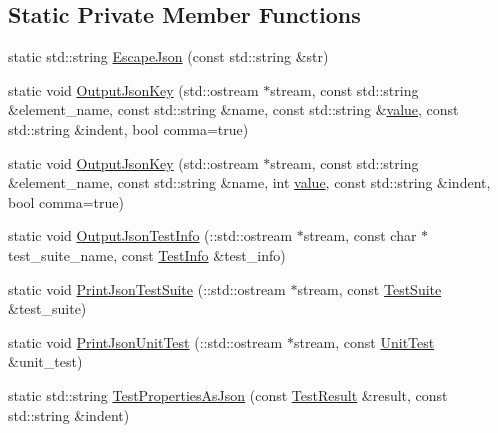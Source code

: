 \subsection*{Static Private Member Functions}
\begin{DoxyCompactItemize}
\item 
static std\+::string \mbox{\hyperlink{classtesting_1_1internal_1_1_json_unit_test_result_printer_a1db1a765a0ed6402d9585f2fe131fde6}{Escape\+Json}} (const std\+::string \&str)
\item 
static void \mbox{\hyperlink{classtesting_1_1internal_1_1_json_unit_test_result_printer_a63dcc481aba7d2305fad8ad9d4d8090c}{Output\+Json\+Key}} (std\+::ostream $\ast$stream, const std\+::string \&element\+\_\+name, const std\+::string \&name, const std\+::string \&\mbox{\hyperlink{_obj__test_2lib_2googletest-master_2googlemock_2test_2gmock-matchers__test_8cc_a337b8a670efc0b086ad3af163f3121b6}{value}}, const std\+::string \&indent, bool comma=true)
\item 
static void \mbox{\hyperlink{classtesting_1_1internal_1_1_json_unit_test_result_printer_a312b071e5ed3913b854490b1e427d326}{Output\+Json\+Key}} (std\+::ostream $\ast$stream, const std\+::string \&element\+\_\+name, const std\+::string \&name, int \mbox{\hyperlink{_obj__test_2lib_2googletest-master_2googlemock_2test_2gmock-matchers__test_8cc_a337b8a670efc0b086ad3af163f3121b6}{value}}, const std\+::string \&indent, bool comma=true)
\item 
static void \mbox{\hyperlink{classtesting_1_1internal_1_1_json_unit_test_result_printer_aca28dc59e9fbf804c9efa97e022d15e1}{Output\+Json\+Test\+Info}} (\+::std\+::ostream $\ast$stream, const char $\ast$test\+\_\+suite\+\_\+name, const \mbox{\hyperlink{classtesting_1_1_test_info}{Test\+Info}} \&test\+\_\+info)
\item 
static void \mbox{\hyperlink{classtesting_1_1internal_1_1_json_unit_test_result_printer_a793db9fbffa145600e4bca3151bfd2c0}{Print\+Json\+Test\+Suite}} (\+::std\+::ostream $\ast$stream, const \mbox{\hyperlink{classtesting_1_1_test_suite}{Test\+Suite}} \&test\+\_\+suite)
\item 
static void \mbox{\hyperlink{classtesting_1_1internal_1_1_json_unit_test_result_printer_a8f4b1ac86fde9a895d2b26c1b013dd38}{Print\+Json\+Unit\+Test}} (\+::std\+::ostream $\ast$stream, const \mbox{\hyperlink{classtesting_1_1_unit_test}{Unit\+Test}} \&unit\+\_\+test)
\item 
static std\+::string \mbox{\hyperlink{classtesting_1_1internal_1_1_json_unit_test_result_printer_af6c2baf27486ffa5ac7fd328044ec235}{Test\+Properties\+As\+Json}} (const \mbox{\hyperlink{classtesting_1_1_test_result}{Test\+Result}} \&result, const std\+::string \&indent)

\end{DoxyCompactItemize}
